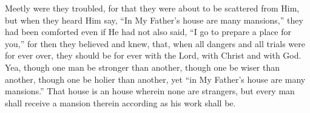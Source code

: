 Meetly were they troubled, for that they were about to be scattered from Him, but when they heard Him say, “In My Father’s house are many mansions,” they had been comforted even if He had not also said, “I go to prepare a place for you,” for then they believed and knew, that, when all dangers and all trials were for ever over, they should be for ever with the Lord, with Christ and with God. Yea, though one man be stronger than another, though one be wiser than another, though one be holier than another, yet “in My Father’s house are many mansions.” That house is an house wherein none are strangers, but every man shall receive a mansion therein according as his work shall be.
